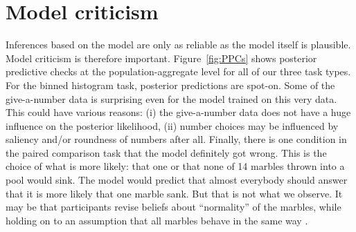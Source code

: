 \documentclass[10pt,letterpaper]{article}
\begin{document}
\section{Model criticism}

Inferences based on the model are only as reliable as the model itself is plausible. Model
criticism is therefore important. Figure~\ref{fig:PPCs} shows posterior predictive checks at
the population-aggregate level for all of our three task types. For the binned histogram task,
posterior predictions are spot-on. Some of the give-a-number data is surprising even for
the model trained on this very data. This could have various reasons: (i) the give-a-number data does
not have a huge influence on the posterior likelihood, (ii) number choices may be influenced by
saliency and/or roundness of numbers after all. Finally, there is one condition in the paired
comparison task that the model definitely got wrong. This is the choice of what is more likely:
that one or that none of 14 marbles thrown into a pool would sink. The model would predict that
almost everybody should answer that it is more likely that one marble sank. But that is not
what we observe. It may be that participants revise beliefs about ``normality'' of the marbles,
while holding on to an assumption that all marbles behave in the same way 
\cite{DegenTessler2015:Wonky-worlds:-L}.
\end{document}
